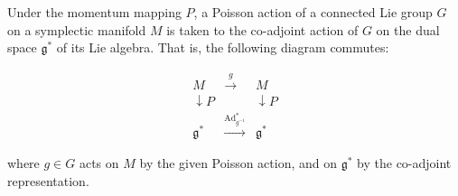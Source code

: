 Under the momentum mapping $P$, a Poisson action of a connected Lie group $G$ on a symplectic manifold $M$ is taken to the co-adjoint action of $G$ on the dual space $\mathfrak{g}^*$ of its Lie algebra. That is, the following diagram commutes:

$$\begin{array}{ccc}
M & \xrightarrow{g} & M \\
\downarrow P & & \downarrow P \\
\mathfrak{g}^* & \xrightarrow{\operatorname{Ad}_{g^{-1}}^*} & \mathfrak{g}^*
\end{array}$$

where $g \in G$ acts on $M$ by the given Poisson action, and on $\mathfrak{g}^*$ by the co-adjoint representation.
